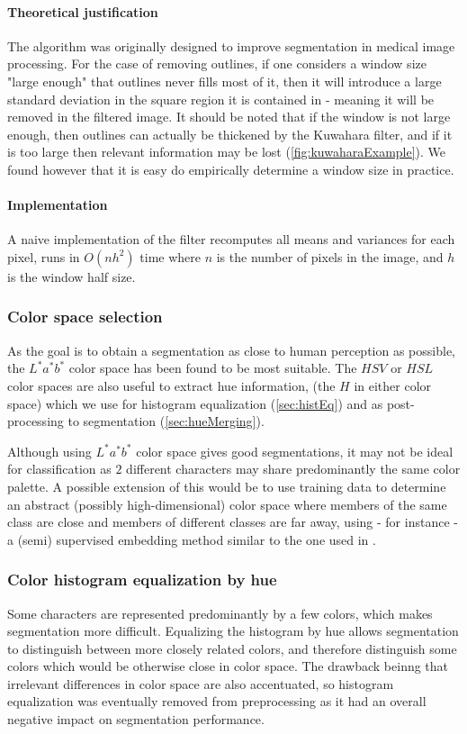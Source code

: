 \paragraph{Theoretical justification} The algorithm was originally designed to improve segmentation in medical image processing. For the case of removing outlines, if one considers a window size "large enough" that outlines never fills most of it, then it will introduce a large standard deviation in the square region it is contained in - meaning it will be removed in the filtered image. It should be noted that if the window is not large enough, then outlines can actually be thickened by the Kuwahara filter, and if it is too large then relevant information may be lost (\autoref{fig:kuwaharaExample}). We found however that it is easy do empirically determine a window size in practice.

\paragraph{Implementation} A naive implementation of the filter recomputes all means and variances for each pixel, runs in $O(nh^2)$ time where $n$ is the number of pixels in the image, and $h$ is the window half size.

\subsubsection{Color space selection}

As the goal is to obtain a segmentation as close to human perception as possible, the $L^*a^*b^*$ color space has been found to be most suitable. The $HSV$ or $HSL$ color spaces are also useful to extract hue information, (the $H$ in either color space) which we use for histogram equalization (\autoref{sec:histEq}) and as post-processing to segmentation (\autoref{sec:hueMerging}).

Although using $L^*a^*b^*$ color space gives good segmentations, it may not be ideal for classification as $2$ different characters may share predominantly the same color palette. A possible extension of this would be to use training data to determine an abstract (possibly high-dimensional) color space where members of the same class are close and members of different classes are far away, using - for instance - a (semi) supervised embedding method similar to the one used in \cite{urahama2007semi}.

\subsubsection{Color histogram equalization by hue}
\label{sec:histEq}

Some characters are represented predominantly by a few colors, which makes segmentation more difficult. Equalizing the histogram by hue allows segmentation to distinguish between more closely related colors, and therefore distinguish some colors which would be otherwise close in color space. The drawback beinng that irrelevant differences in color space are also accentuated, so histogram equalization was eventually removed from preprocessing as it had an overall negative impact on segmentation performance.